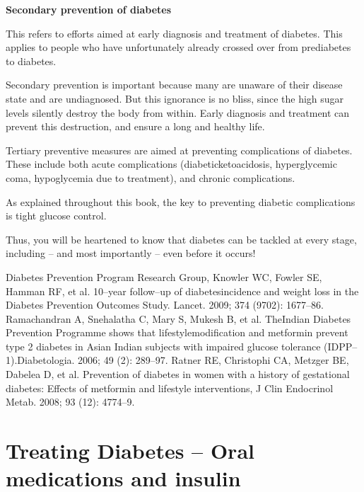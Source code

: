 \noindent\textbf{Secondary prevention of diabetes}

This refers to efforts aimed at early diagnosis and treatment of dia\-betes. This applies to people who have unfortunately already crossed over from prediabetes to diabetes.

Secondary prevention is important because many are unaware of their disease state and are undiagnosed. But this ignorance is no bliss, since the high sugar levels silently destroy the body from within. Early diagnosis and treatment can prevent this destruction, and ensure a long and healthy life.

\vskip 6pt


Tertiary preventive measures are aimed at preventing complications of diabetes. These include both acute complications (diabetic\break ketoacidosis, hyperglycemic coma, hypoglycemia due to treatment), and chronic complications.

As explained throughout this book, the key to preventing diabetic complications is tight glucose control.

Thus, you will be heartened to know that diabetes can be tackled at every stage, including – and most importantly – even before it occurs!

\begin{thebibliography}{99}
 Diabetes Prevention Program Research Group, Knowler WC, Fowler SE, Hamman RF, et al. 10–year follow–up of diabetes\break incidence and weight loss in the Diabetes Prevention Outcomes Study. Lancet. 2009; 374 (9702): 1677–86.
 Ramachandran A, Snehalatha C, Mary S, Mukesh B, et al. The\break Indian Diabetes Prevention Programme shows that lifestyle\break modification and metformin prevent type 2 diabetes in Asian Indian subjects with impaired glucose tolerance (IDPP–1).\break Diabetologia. 2006; 49 (2): 289–97.
 Ratner RE, Christophi CA, Metzger BE, Dabelea D, et al. Prevention of diabetes in women with a history of gestational diabetes: Effects of metformin and lifestyle interventions, J Clin Endocrinol Metab. 2008; 93 (12): 4774–9.
\end{thebibliography}


\chapter{Treating Diabetes – Oral medications and insulin}\label{chap26}

